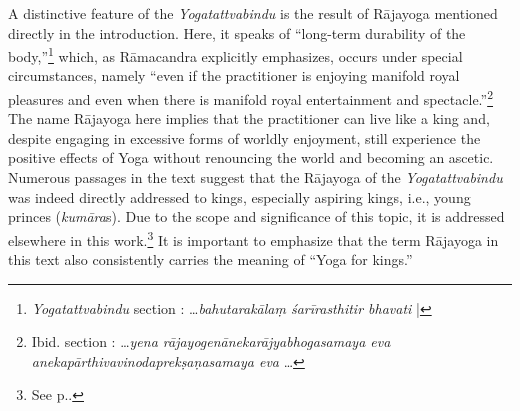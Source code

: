 A distinctive feature of the \emph{Yogatattvabindu} is the result of Rājayoga mentioned directly in the introduction. Here, it speaks of ``long-term durability of the body,''\footnote{\emph{Yogatattvabindu} section : \ldots \textit{bahutarakālaṃ śarīrasthitir bhavati} |} which, as Rāmacandra explicitly emphasizes, occurs under special circumstances, namely ``even if the practitioner is enjoying manifold royal pleasures and even when there is manifold royal entertainment and spectacle.''\footnote{Ibid. section : \ldots \textit{yena rājayogenānekarājyabhogasamaya eva anekapārthivavinodaprekṣaṇasamaya eva} \ldots} The name Rājayoga here implies that the practitioner can live like a king and, despite engaging in excessive forms of worldly enjoyment, still experience the positive effects of Yoga without renouncing the world and becoming an ascetic. Numerous passages in the text suggest that the Rājayoga of the \textit{Yogatattvabindu} was indeed directly addressed to kings, especially aspiring kings, i.e., young princes (\textit{kumāra}s). Due to the scope and significance of this topic, it is addressed elsewhere in this work.\footnote{See p.\pageref{ytbaudience}.} It is important to emphasize that the term Rājayoga in this text also consistently carries the meaning of ``Yoga for kings.''

